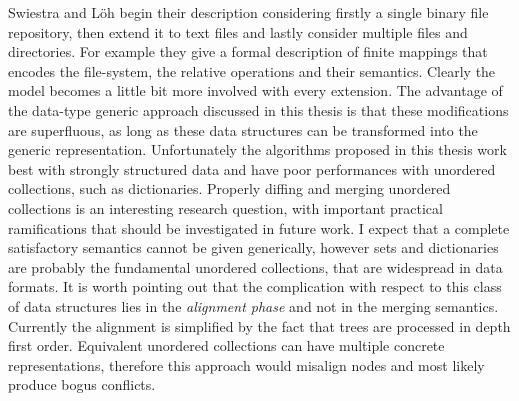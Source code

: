 \documentclass[../Thesis.tex]{subfiles}
\begin{document}
Swiestra and L\"oh begin their description considering firstly 
a single binary file repository, then extend it to text files and lastly consider multiple files and directories. 
For example they give a formal description of finite 
mappings that encodes the file-system, the relative operations and their semantics.
Clearly the model becomes a little bit more involved with every extension. 
The advantage of the data-type generic approach discussed in this thesis
is that these modifications are superfluous, as long as these data structures
can be transformed into the generic representation.
Unfortunately the algorithms proposed in this thesis work best with strongly 
structured data and have poor performances with unordered collections,
such as dictionaries.
Properly diffing and merging unordered collections is an interesting research question, with important practical ramifications that should be investigated in future work.
I expect that a complete satisfactory semantics cannot be given generically,
however sets and dictionaries are probably the fundamental unordered collections, that are widespread in data formats.
It is worth pointing out that the complication with respect to this class
of data structures lies in the \emph{alignment phase} and not in
the merging semantics. Currently the alignment is simplified by the fact
that trees are processed in depth first order. Equivalent unordered collections
can have multiple concrete representations, therefore this approach 
would misalign nodes and most likely produce bogus conflicts.
\end{document}
